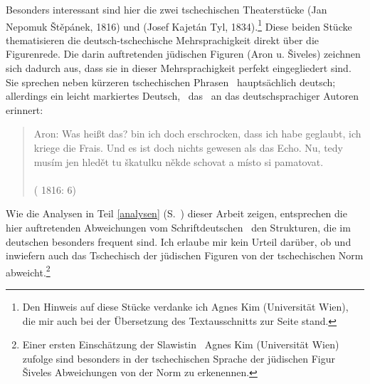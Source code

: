 Besonders interessant sind hier die zwei tschechischen
Theaterstücke   (Jan Nepomuk Štěpánek, 1816) und   (Josef Kajetán Tyl, 1834).\footnote{Den Hinweis auf diese Stücke verdanke ich Agnes Kim (Universität Wien), die mir auch bei der Übersetzung des Textausschnitts zur Seite stand.} Diese beiden Stücke thematisieren die deutsch-tschechische Mehrsprachigkeit direkt über die Figurenrede. Die darin auftretenden jüdischen Figuren (Aron u. Šiveles) zeichnen sich dadurch aus, dass sie in dieser Mehrsprachigkeit perfekt eingegliedert sind. Sie sprechen neben kürzeren tschechischen Phrasen \,%
hauptsächlich deutsch; allerdings ein leicht markiertes Deutsch, \,%
das \,%
an das \hai{{\LiJi}} deutschsprachiger Autoren erinnert: 

\begin{quote}

Aron: Was heißt das? bin ich doch erschrocken, dass ich habe geglaubt, ich kriege die Frais. Und es ist doch nichts gewesen als das Echo. Nu, tedy musím jen hledět tu škatulku někde schovat a místo si pamatovat. \\ 
{ }\\
( 1816: 6)

\end{quote}

Wie die Analysen in Teil \ref{analysen} (S.\, \pageref{analysen}) dieser Arbeit zeigen, entsprechen die hier auftretenden Abweichungen vom Schriftdeutschen \,%
den Strukturen, die im deutschen \hai{{\LiJi}} besonders frequent sind. Ich erlaube mir kein Urteil darüber, ob und inwiefern auch das Tschechisch der jüdischen Figuren von der tschechischen Norm abweicht.\footnote{Einer ersten Einschätzung der Slawistin \,%
Agnes Kim (Universität Wien) zufolge sind besonders in der  tschechischen Sprache der jüdischen Figur Šiveles Abweichungen von der Norm zu erkenennen.} 

